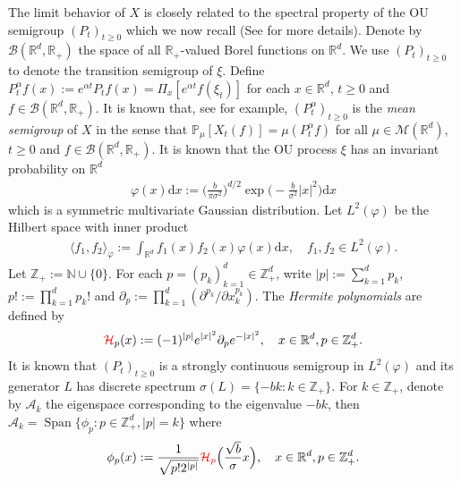 \documentclass[12pt,a4paper]{amsart}
\theoremstyle{plain}
\theoremstyle{definition}
\numberwithin{equation}{section}
\begin{document}
The limit behavior of $X$  is closely related to the spectral property of the OU semigroup $(P_t)_{t\geq 0}$ which we now recall (See \cite{MetafunePallaraPriola2002Spectrum} for more details).
Denote by $\mathcal B(\mathbb R^d, \mathbb R_+)$ the space of all $\mathbb R_+$-valued Borel functions on $\mathbb R^d$.
We use  $(P_t)_{t\geq 0}$ to denote the transition semigroup of $\xi$.	
Define
\(
P^{\alpha}_t f(x)
  := e^{\alpha t} P_t f(x)
  = \Pi_x [e^{\alpha t}f(\xi_t)]
\)
for each $x\in \mathbb R^d$, $t\geq 0$ and $f\in \mathcal B(\mathbb R^d, \mathbb R_+)$.
It is known that, see \cite[Proposition 2.27]{Li2011Measure-valued} for example, $(P^\alpha_t)_{t\geq 0}$ is the \emph{mean semigroup} of $X$ in the sense that
\(
  \mathbb{P}_{\mu}[X_t (f)]  = \mu( P^\alpha_t f)
\)
for all $\mu\in \mathcal M(\mathbb R^d)$, $t\geq 0$ and $f\in \mathcal B(\mathbb R^d, \mathbb R_+)$.
It is known that the OU process $\xi$ has an invariant probability on $\mathbb R^d$
\begin{align}
  \label{invariantdensity}
  \varphi(x)\mathrm dx
  :=\Big (\frac{b}{\pi \sigma^2}\Big )^{d/2}\exp \Big(-\frac{b}{\sigma^2}|x|^2 \Big)\mathrm dx
\end{align}
which is a   symmetric multivariate Gaussian distribution.
Let $L^2(\varphi)$ be the Hilbert space with inner product
\begin{align}
  \langle f_1, f_2 \rangle_{\varphi}
  := \int_{\mathbb R^d}f_1(x)f_2(x)\varphi(x) \mathrm dx, \quad f_1,f_2 \in L^2(\varphi).
\end{align}
Let $\mathbb Z_+ := \mathbb N\cup\{0\}$.
For each $p = (p_k)_{k = 1}^d \in \mathbb{Z}_+^{d}$, write $|p|:=\sum_{k=1}^d p_k$, $p!:= \prod_{k= 1}^d p_k!$ and $\partial_p:= \prod_{k = 1}^d(\partial^{p_k}/\partial x_k^{p_k})$.
The \emph{Hermite polynomials} are defined by
\begin{align}
  {\color{red}\mathcal H}_p(x)
  :=(-1)^{|p|}e^{|x|^2} \partial_p e^{-|x|^2}
  , \quad x\in \mathbb R^d, p \in \mathbb{Z}_+^{d}.
\end{align}
It is known that $(P_t)_{t\geq 0}$ is a strongly continuous semigroup in $L^2(\varphi)$ and its generator $L$ has discrete spectrum $\sigma(L)= \{-bk: k \in \mathbb Z_+\}$.
For $k \in \mathbb Z_+$, denote by $\mathcal{A}_k$ the eigenspace corresponding to the eigenvalue $-bk$, then $ \mathcal{A}_k = \operatorname{Span} \{\phi_p : p\in \mathbb Z_+^d, |p|=k\}$ where
\begin{align}
  \label{eigenfunction}
  \phi_p(x)
  := \frac{1}{\sqrt{ p! 2^{|p|} }} {\color{red}\mathcal H_p} \Big(\frac{ \sqrt{b} }{\sigma}x \Big)
  , \quad x\in \mathbb R^d, p\in \mathbb Z_+^d.
\end{align}
\end{document}
